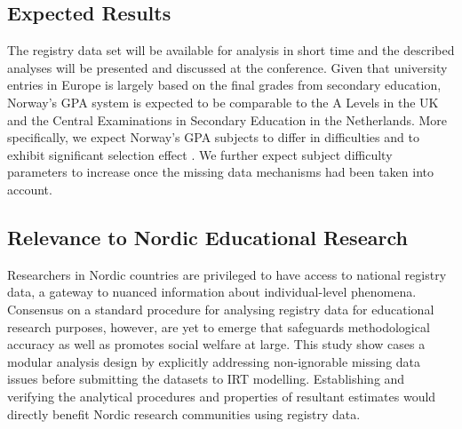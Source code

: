 \subsection{Expected Results}

The registry data set will be available for analysis in short time and the described analyses will be presented and discussed at the conference. Given that university entries in Europe is largely based on the final grades from secondary education, Norway's GPA system is expected to be comparable to the A Levels in the UK and the Central Examinations in Secondary Education in the Netherlands. More specifically, we expect Norway's GPA subjects to differ in difficulties \parencite[per report by][]{he:2018} and to exhibit significant selection effect \parencite[as demonstrated in][]{korobko:2008}. We further expect subject difficulty parameters to increase once the missing data mechanisms had been taken into account.

\subsection{Relevance to Nordic Educational Research}

Researchers in Nordic countries are privileged to have access to national registry data, a gateway to nuanced information about individual-level phenomena. Consensus on a standard procedure for analysing registry data for educational research purposes, however, are yet to emerge that safeguards methodological accuracy as well as promotes social welfare at large. This study show cases a modular analysis design by explicitly addressing non-ignorable missing data issues before submitting the datasets to IRT modelling. Establishing and verifying the analytical procedures and properties of resultant estimates would directly benefit Nordic research communities using registry data.

\printbibliography